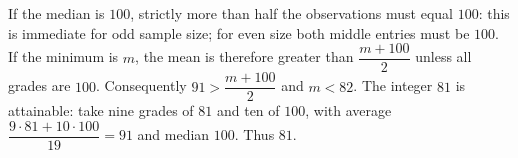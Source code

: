 If the median is $100$, strictly more than half the observations must equal $100$: this is immediate for odd sample size; for even size both middle entries must be $100$. If the minimum is $m$, the mean is therefore greater than $\dfrac{m+100}{2}$ unless all grades are $100$. Consequently $91>\dfrac{m+100}{2}$ and $m<82$. The integer $81$ is attainable: take nine grades of $81$ and ten of $100$, with average $\dfrac{9\cdot81+10\cdot100}{19}=91$ and median $100$. Thus $\boxed{81}$.
